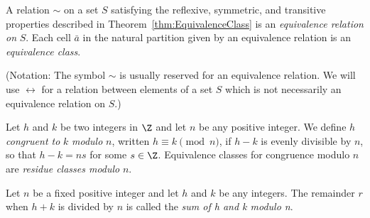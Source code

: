\begin{definition}
A relation $\sim$ on a set $S$ satisfying the reflexive, symmetric,
and transitive properties described in
Theorem~\ref{thm:EquivalenceClass} is an \emph{equivalence relation
on} $S$.  Each cell $\bar{a}$ in the natural partition given by an
equivalence relation is an \emph{equivalence class}.
\end{definition}
(Notation: The symbol $\sim$ is usually reserved for an equivalence
relation.  We will use $\rel$ for a relation between elements of a set
$S$ which is not necessarily an equivalence relation on $S$.)

\begin{definition}\label{def:congruence}
Let $h$ and $k$ be two integers in $\Z$ and let $n$ be any positive
integer.  We define $h$ \emph{congruent to} $k$ \emph{modulo} $n$,
written $h\equiv k \pmod n$, if $h - k$ is evenly divisible by $n$,
so that $h - k = ns$ for some $s\in \Z$.
Equivalence classes for congruence modulo $n$ are 
\emph{residue classes modulo} $n$.
\end{definition}

\begin{definition}
Let $n$ be a fixed positive integer and let $h$ and $k$ be any
integers.  The remainder $r$ when $h+k$ is divided by $n$ is called
the \emph{sum of h and k modulo n}.
\end{definition}


